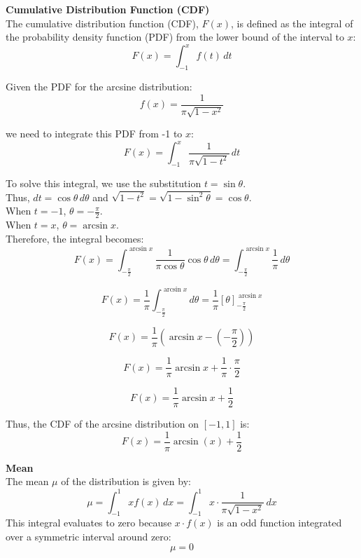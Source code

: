 \documentclass{ioereport}
\begin{document}
\textbf{Cumulative Distribution Function (CDF)}\\
The cumulative distribution function (CDF), \( F(x) \), is defined as the integral of the probability density function (PDF) from the lower bound of the interval to \( x \):
\begin{equation}
    F(x) = \int_{-1}^{x} f(t) \, dt
\end{equation}

Given the PDF for the arcsine distribution:
\[
f(x) = \frac{1}{\pi \sqrt{1-x^2}}
\]

we need to integrate this PDF from -1 to \( x \):
\[
F(x) = \int_{-1}^{x} \frac{1}{\pi \sqrt{1-t^2}} \, dt
\]

To solve this integral, we use the substitution \( t = \sin \theta \).\\
Thus, \( dt = \cos \theta \, d\theta \) and \( \sqrt{1-t^2} = \sqrt{1-\sin^2 \theta} = \cos \theta \).\\
When \( t = -1 \), \( \theta = -\frac{\pi}{2} \).\\
When \( t = x \), \( \theta = \arcsin x \).\\
Therefore, the integral becomes:
\[
F(x) = \int_{-\frac{\pi}{2}}^{\arcsin x} \frac{1}{\pi \cos \theta} \cos \theta \, d\theta = \int_{-\frac{\pi}{2}}^{\arcsin x} \frac{1}{\pi} \, d\theta
\]

\[
F(x) = \frac{1}{\pi} \int_{-\frac{\pi}{2}}^{\arcsin x} d\theta = \frac{1}{\pi} \left[ \theta \right]_{-\frac{\pi}{2}}^{\arcsin x}
\]

\[
F(x) = \frac{1}{\pi} \left( \arcsin x - \left( -\frac{\pi}{2} \right) \right)
\]

\[
F(x) = \frac{1}{\pi} \arcsin x + \frac{1}{\pi} \cdot \frac{\pi}{2}
\]

\[
F(x) = \frac{1}{\pi} \arcsin x + \frac{1}{2}
\]

Thus, the CDF of the arcsine distribution on \([-1, 1]\) is:
\begin{equation}
    F(x) = \frac{1}{\pi} \arcsin(x) + \frac{1}{2}
\end{equation}

\textbf{Mean}\\
The mean \(\mu\) of the distribution is given by:
\begin{equation}
    \mu = \int_{-1}^{1} x f(x) \, dx = \int_{-1}^{1} x \cdot \frac{1}{\pi \sqrt{1-x^2}} \, dx
\end{equation}
This integral evaluates to zero because \( x \cdot f(x) \) is an odd function integrated over a symmetric interval around zero:
\begin{equation}
    \mu = 0
\end{equation}
\end{document}
